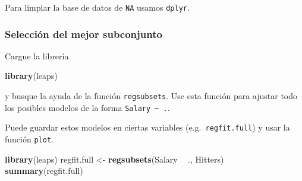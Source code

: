 \documentclass[
  12pt,
]{book}
\newenvironment{Shaded}{\begin{snugshade}}{\end{snugshade}}
\newcommand{\KeywordTok}[1]{\textcolor[rgb]{0.13,0.29,0.53}{\textbf{#1}}}
\newcommand{\NormalTok}[1]{#1}
\newcommand{\OperatorTok}[1]{\textcolor[rgb]{0.81,0.36,0.00}{\textbf{#1}}}
\newcommand{\StringTok}[1]{\textcolor[rgb]{0.31,0.60,0.02}{#1}}
\theoremstyle{definition}
\theoremstyle{definition}
\theoremstyle{definition}
\theoremstyle{remark}
\begin{document}
Para limpiar la base de datos de \texttt{NA} usamos \texttt{dplyr}.

\begin{Shaded}
\end{Shaded}

\hypertarget{selecciuxf3n-del-mejor-subconjunto}{%
\subsubsection{Selección del mejor subconjunto}\label{selecciuxf3n-del-mejor-subconjunto}}

Cargue la librería

\begin{Shaded}
\begin{Highlighting}[]
\KeywordTok{library}\NormalTok{(leaps)}
\end{Highlighting}
\end{Shaded}

y busque la ayuda de la función \texttt{regsubsets}. Use esta función para ajustar todo los posibles modelos de la forma \texttt{Salary\ \textasciitilde{}\ .}.

Puede guardar estos modelos en ciertas variables (e.g.~\texttt{regfit.full}) y usar la función \texttt{plot}.

\begin{Shaded}
\begin{Highlighting}[]
\KeywordTok{library}\NormalTok{(leaps)}
\NormalTok{regfit.full <-}\StringTok{ }\KeywordTok{regsubsets}\NormalTok{(Salary }\OperatorTok{~}\StringTok{ }\NormalTok{., Hitters)}
\KeywordTok{summary}\NormalTok{(regfit.full)}
\end{Highlighting}
\end{Shaded}
\end{document}
